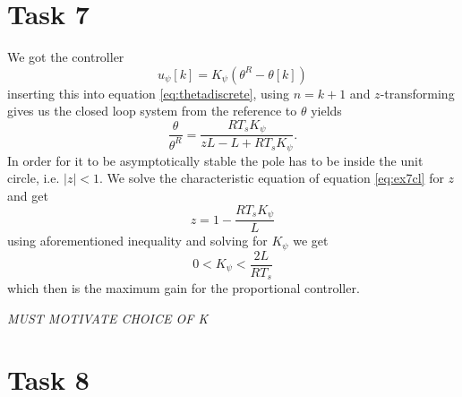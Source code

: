\documentclass[a4paper,12pt,oneside,onecolumn]{article} %
\begin{document}
\section*{Task 7}
We got the controller
\begin{equation}
u_{\psi}[k] = K_{\psi} (\theta^R - \theta[k])
\end{equation}
inserting this into equation \eqref{eq:thetadiscrete}, using $n = k+1$ and $z$-transforming gives us the closed loop system from the reference to $\theta$ yields
\begin{equation}
\label{eq:ex7cl}
\frac{\theta}{\theta^{R}} = \frac{RT_s K_{\psi}}{zL - L + RT_s K_{\psi}}.
\end{equation}
In order for it to be asymptotically stable the pole has to be inside the unit circle, i.e. $\vert z \vert < 1$. We solve the characteristic equation of equation \eqref{eq:ex7cl} for $z$ and get
\begin{equation}
z = 1 - \frac{RT_s K_{\psi}}{L}
\end{equation}
using aforementioned inequality and solving for $K_{\psi}$ we get
\begin{equation}
0 < K_{\psi} < \frac{2L}{RT_s}
\end{equation}
which then is the maximum gain for the proportional controller.

\textit{MUST MOTIVATE CHOICE OF K}
\section*{Task 8}
\end{document}
